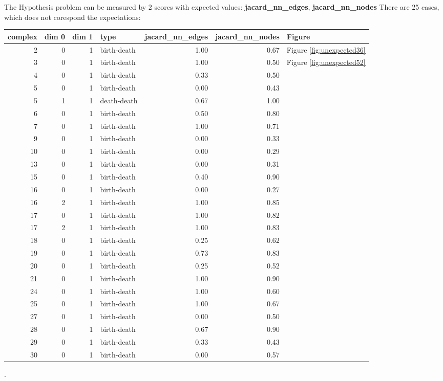 \documentclass{article}
\begin{document}
    \par The Hypothesis problem can be measured by 2 scores with expected 
    values: \textbf{jacard\_nn\_edges}, \textbf{jacard\_nn\_nodes}
    There are 25 cases, which does not corespond the expectations: 
\begin{center}
\begin{tabular}{rrrlrrl}
\toprule
complex & dim 0 & dim 1 & type & jacard\_nn\_edges & jacard\_nn\_nodes & Figure \\
\midrule
2 & 0 & 1 & birth-death & 1.00 & 0.67 & Figure \ref{fig:unexpected36} \\
3 & 0 & 1 & birth-death & 1.00 & 0.50 & Figure \ref{fig:unexpected52} \\
4 & 0 & 1 & birth-death & 0.33 & 0.50 &  \\
5 & 0 & 1 & birth-death & 0.00 & 0.43 &  \\
5 & 1 & 1 & death-death & 0.67 & 1.00 &  \\
6 & 0 & 1 & birth-death & 0.50 & 0.80 &  \\
7 & 0 & 1 & birth-death & 1.00 & 0.71 &  \\
9 & 0 & 1 & birth-death & 0.00 & 0.33 &  \\
10 & 0 & 1 & birth-death & 0.00 & 0.29 &  \\
13 & 0 & 1 & birth-death & 0.00 & 0.31 &  \\
15 & 0 & 1 & birth-death & 0.40 & 0.90 &  \\
16 & 0 & 1 & birth-death & 0.00 & 0.27 &  \\
16 & 2 & 1 & birth-death & 1.00 & 0.85 &  \\
17 & 0 & 1 & birth-death & 1.00 & 0.82 &  \\
17 & 2 & 1 & birth-death & 1.00 & 0.83 &  \\
18 & 0 & 1 & birth-death & 0.25 & 0.62 &  \\
19 & 0 & 1 & birth-death & 0.73 & 0.83 &  \\
20 & 0 & 1 & birth-death & 0.25 & 0.52 &  \\
21 & 0 & 1 & birth-death & 1.00 & 0.90 &  \\
24 & 0 & 1 & birth-death & 1.00 & 0.60 &  \\
25 & 0 & 1 & birth-death & 1.00 & 0.67 &  \\
27 & 0 & 1 & birth-death & 0.00 & 0.50 &  \\
28 & 0 & 1 & birth-death & 0.67 & 0.90 &  \\
29 & 0 & 1 & birth-death & 0.33 & 0.43 &  \\
30 & 0 & 1 & birth-death & 0.00 & 0.57 &  \\
\bottomrule
\end{tabular}
\end{center}.
    
\end{document}
